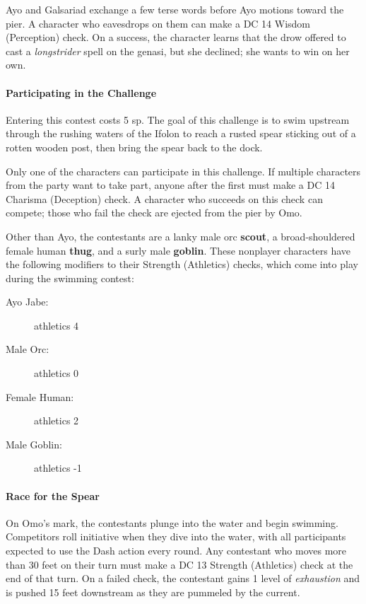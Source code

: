 \documentclass[a4paper, 11pt, bg=full, twocolumn, nooutline]{dndbook}
\begin{document}
Ayo and Galsariad exchange a few terse words before Ayo motions toward the pier. A character who eavesdrops on them can make a DC 14 Wisdom (Perception) check. On a success, the character learns that the drow offered to cast a \textit{longstrider} spell on the genasi, but she declined; she wants to win on her own.

\paragraph{Participating in the Challenge}

Entering this contest costs 5 sp. The goal of this challenge is to swim upstream through the rushing waters of the Ifolon to reach a rusted spear sticking out of a rotten wooden post, then bring the spear back to the dock.

Only one of the characters can participate in this challenge. If multiple characters from the party want to take part, anyone after the first must make a DC 14 Charisma (Deception) check. A character who succeeds on this check can compete; those who fail the check are ejected from the pier by Omo.

Other than Ayo, the contestants are a lanky male orc \textbf{scout}, a broad-shouldered female human \textbf{thug}, and a surly male \textbf{goblin}. These nonplayer characters have the following modifiers to their Strength (Athletics) checks, which come into play during the swimming contest:

\begin{description}
\item[Ayo Jabe:] athletics 4
\item[Male Orc:] athletics 0
\item[Female Human:] athletics 2
\item[Male Goblin:] athletics -1
\end{description}

\paragraph{Race for the Spear}

On Omo's mark, the contestants plunge into the water and begin swimming. Competitors roll initiative when they dive into the water, with all participants expected to use the Dash action every round. Any contestant who moves more than 30 feet on their turn must make a DC 13 Strength (Athletics) check at the end of that turn. On a failed check, the contestant gains 1 level of \textit{exhaustion} and is pushed 15 feet downstream as they are pummeled by the current.
\end{document}
